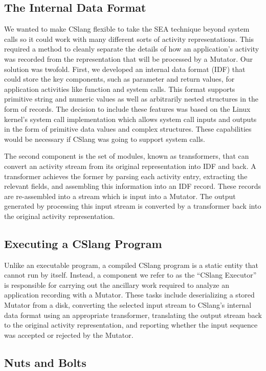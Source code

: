 \subsection{The Internal Data Format}

We wanted to make CSlang flexible
to take the SEA technique beyond system calls
so it could
work with many different sorts of
activity representations.
This required a method to cleanly separate the details of how
an application's activity was recorded from the representation that will be
processed by a Mutator.
Our solution was twofold.  First, we developed an internal data format
(IDF) that
could store the key components, such as parameter and return values,
for application activities like function
and system calls.  This format supports primitive string and numeric
values as well as arbitrarily nested structures in the form of records.
The decision to include these features
was based on the Linux kernel's system call implementation
which allows system call inputs and outputs in the form of primitive data
values and complex structures.
These capabilities would be necessary
if CSlang was going to support system calls.

The second component is the set of modules, known as transformers, that can
convert an activity stream from its original representation into IDF and
back.  A transformer achieves the former by parsing each activity entry,
extracting the relevant fields, and assembling this information into an IDF
record.  These records are re-assembled into a stream which is input into a
Mutator.
The output generated by processing this input stream
is converted by a transformer
back into the original activity representation.

\subsection{Executing a CSlang Program}

Unlike an executable program, a compiled CSlang program is a static entity
that cannot run by itself.  Instead, a component we refer to as the
``CSlang Executor'' is responsible for carrying out the ancillary work
required to analyze an application recording with a Mutator.
These tasks include deserializing a stored Mutator from a disk,
converting the selected input stream
to CSlang's internal data format
using an appropriate transformer,
translating the output stream back to the original activity representation,
and reporting whether the input sequence was
accepted or rejected by the Mutator.

\subsection{Nuts and Bolts}

